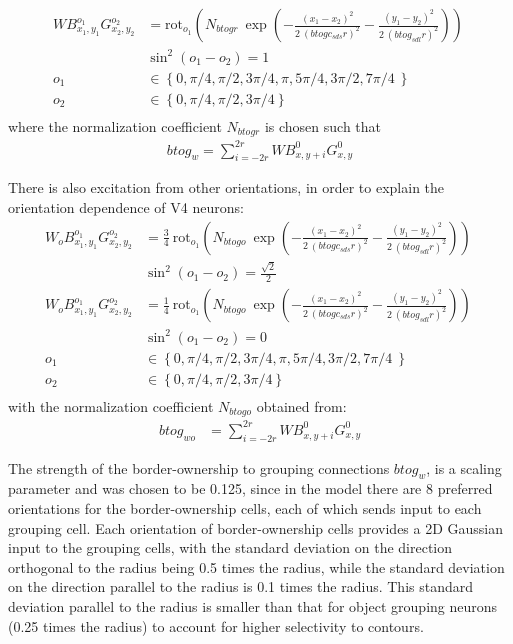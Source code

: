 \begin{align}
	WB^{o_1}_{x_1,y_1}G^{o_2}_{x_2,y_2}&=\text{rot}_{o_1}\left(N_{btogr}\: \exp\left(-\frac{(x_1-x_2)^2}{2\: (btogc_{sds} r)^2}
	-\frac{(y_1-y_2)^2}{2\: (btog_{sdl} r)^2}\right)\right)\  \nonumber\\ 
	 &\sin^2(o_1-o_2) = 1 \nonumber\\
	 o_1&\in \left\{0,\pi/4,\pi/2,3\pi/4,\pi,5\pi/4,3\pi/2,7\pi/4\ \right\} \nonumber\\
	 o_2&\in \left\{0,\pi/4,\pi/2,3\pi/4 \right\} \nonumber\\
\end{align}
where the normalization coefficient $N_{btogr}$ is chosen such that
\begin{align}
	btog_w=\sum^{2r}_{i=-2r} WB^{0}_{x,y+i}G^{0}_{x,y}
\end{align}

There is also excitation from other orientations, in order to explain the orientation dependence
of V4 neurons:
\begin{align}
	W_{o}B^{o_1}_{x_1,y_1}G^{o_2}_{x_2,y_2}&=\frac{3}{4}\: \text{rot}_{o_1}\left(N_{btogo}\: \exp\left(-\frac{(x_1-x_2)^2}{2\: (btogc_{sds} r)^2}
        -\frac{(y_1-y_2)^2}{2\: (btog_{sdl} r)^2}\right)\right)\ \nonumber\\
        	 &\sin^2(o_1-o_2) = \frac{\sqrt{2}}{2} \nonumber\\
    W_{o}B^{o_1}_{x_1,y_1}G^{o_2}_{x_2,y_2}&=\frac{1}{4}\: \text{rot}_{o_1}\left(N_{btogo}\: \exp\left(-\frac{(x_1-x_2)^2}{2\: (btogc_{sds} r)^2}
        -\frac{(y_1-y_2)^2}{2\: (btog_{sdl} r)^2}\right)\right)\ \nonumber\\
        	 &\sin^2(o_1-o_2) = 0 \nonumber\\
	 o_1&\in \left\{0,\pi/4,\pi/2,3\pi/4,\pi,5\pi/4,3\pi/2,7\pi/4\ \right\} \nonumber\\
	 o_2&\in \left\{0,\pi/4,\pi/2,3\pi/4 \right\} \nonumber\\
\end{align}
with the normalization coefficient $N_{btogo}$ obtained from:
\begin{align}
	btog_{wo}&=\sum^{2r}_{i=-2r} WB^{0}_{x,y+i}G^{0}_{x,y} 	
\end{align}

The strength of the border-ownership to grouping connections $btog_w$,
is a scaling parameter and was chosen to be 0.125, since in the model
there are 8 preferred orientations for the border-ownership cells,
each of which sends input to each grouping cell. Each orientation of
border-ownership cells provides a 2D Gaussian input to the grouping
cells, with the standard deviation on the direction orthogonal to the
radius being 0.5 times the radius, while the standard deviation on the
direction parallel to the radius is 0.1 times the radius. This standard deviation parallel to the radius is smaller than that for object grouping neurons (0.25 times the radius) to account for higher selectivity to contours.

